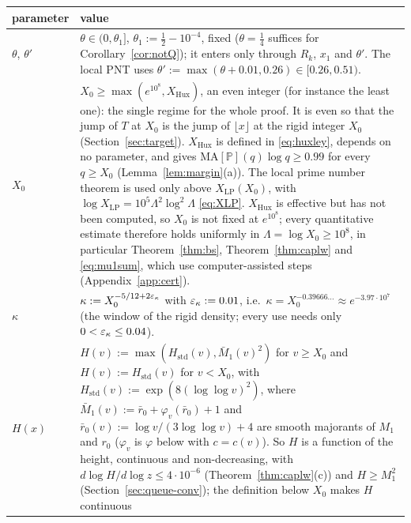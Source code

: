 \begin{center}\small
\begin{tabular}{@{}p{2.1cm}p{12.4cm}@{}}
\hline
parameter & value \\ \hline
$\theta$, $\theta'$ & $\theta\in(0,\theta_1]$, $\theta_1:=\tfrac12-10^{-4}$, fixed ($\theta=\tfrac14$ suffices for
Corollary~\ref{cor:notQ}); it enters only through $R_k$, $x_1$ and $\theta'$. The local PNT uses
$\theta':=\max(\theta+0.01,0.26)\in[0.26,0.51)$. \\
$X_0$ & $X_0\ge\max(e^{10^8},X_{\mathrm{Hux}})$, an even integer (for instance the least one): the single regime for the whole
proof. It is even so that the jump of $T$ at $X_0$ is the jump of $\lfloor x\rfloor$ at the rigid integer $X_0$ (Section~\ref{sec:target}). $X_{\mathrm{Hux}}$ is defined in
\eqref{eq:huxley}, depends on no parameter, and gives $\mathrm{MA}[\mathbb P](q)\log q\ge0.99$ for every $q\ge X_0$
(Lemma~\ref{lem:margin}(a)). The local prime number theorem is used only above $X_{\mathrm{LP}}(X_0)$, with
$\log X_{\mathrm{LP}}=10^5\Lambda^2\log^2\Lambda$ \eqref{eq:XLP}. $X_{\mathrm{Hux}}$ is effective but has not been computed, so $X_0$
is not fixed at $e^{10^8}$; every quantitative estimate therefore holds uniformly in $\Lambda=\log X_0\ge10^8$, in particular
Theorem~\ref{thm:bs}, Theorem~\ref{thm:caplw} and \eqref{eq:mu1sum}, which use computer-assisted steps
(Appendix~\ref{app:cert}). \\
$\kappa$ & $\kappa:=X_0^{-5/12+2\varepsilon_\kappa}$ with $\varepsilon_\kappa:=0.01$, i.e.\ $\kappa=X_0^{-0.39666\ldots}\approx e^{-3.97\cdot10^7}$ (the window of the
rigid density; every use needs only $0<\varepsilon_\kappa\le0.04$). \\
$H(x)$ & $H(v):=\max(H_{\mathrm{std}}(v),\bar M_1(v)^2)$ for $v\ge X_0$ and $H(v):=H_{\mathrm{std}}(v)$ for $v<X_0$, with
$H_{\mathrm{std}}(v):=\exp(8(\log\log v)^2)$, where
$\bar M_1(v):=\bar r_0+\varphi_v(\bar r_0)+1$ and $\bar r_0(v):=\log v/(3\log\log v)+4$ are smooth majorants of $M_1$ and $r_0$
($\varphi_v$ is $\varphi$ below with $c=c(v)$). So $H$ is a function of the height, continuous and non-decreasing, with
$d\log H/d\log z\le4\cdot10^{-6}$ (Theorem~\ref{thm:caplw}(c)) and $H\ge M_1^2$ (Section~\ref{sec:queue-conv}); the definition below $X_0$ makes $H$ continuous

\end{tabular}
\end{center}
